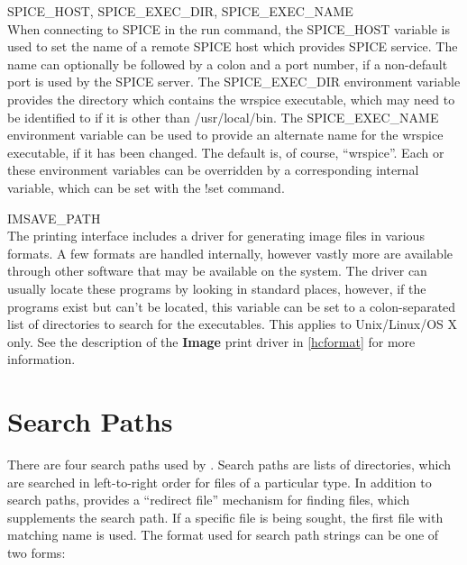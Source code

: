 \begin{description}
\item{{\et SPICE\_HOST}, {\et SPICE\_EXEC\_DIR}, {\et SPICE\_EXEC\_NAME}}\\
When connecting to SPICE in the {\cb run} command, the {\et
SPICE\_HOST} variable is used to set the name of a remote SPICE host
which provides SPICE service.  The name can optionally be followed by
a colon and a port number, if a non-default port is used by the SPICE
server.  The {\et SPICE\_EXEC\_DIR} environment variable provides the
directory which contains the {\vt wrspice} executable, which may need
to be identified to {\Xic} if it is other than {\vt /usr/local/bin}. 
The {\et SPICE\_EXEC\_NAME} environment variable can be used to
provide an alternate name for the {\vt wrspice} executable, if it has
been changed.  The default is, of course, ``{\vt wrspice}''.  Each or
these environment variables can be overridden by a corresponding
internal variable, which can be set with the {\cb !set} command.

\item{\et IMSAVE\_PATH}\\
The printing interface includes a driver for generating image files in
various formats.  A few formats are handled internally, however vastly
more are available through other software that may be available on the
system.  The driver can usually locate these programs by looking in
standard places, however, if the programs exist but can't be located,
this variable can be set to a colon-separated list of directories to
search for the executables.  This applies to Unix/Linux/OS X only. 
See the description of the {\bf Image} print driver in \ref{hcformat}
for more information.
\end{description}


\section{{\Xic} Search Paths}
\label{searchpaths}

There are four search paths used by {\Xic}.  Search paths are lists of
directories, which are searched in left-to-right order for files of a
particular type.  In addition to search paths, {\Xic} provides a
``redirect file'' mechanism for finding files, which supplements the
search path.  If a specific file is being sought, the first file with
matching name is used.  The format used for search path strings can be
one of two forms:

